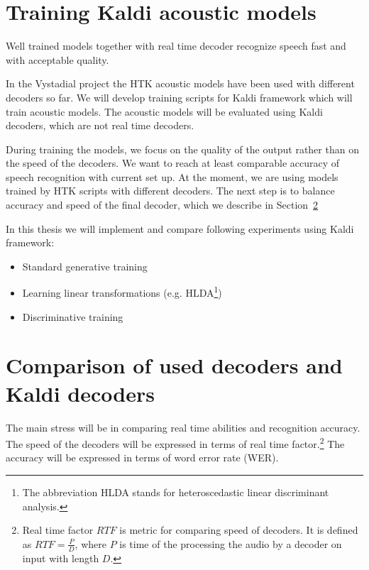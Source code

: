 
\section{Training Kaldi acoustic models} 
\label{sec:training_kaldi_acoustic_models}
Well trained models together with real time decoder recognize speech fast and with acceptable quality.

In the Vystadial project the HTK acoustic models have been used with different decoders so far. We will develop training scripts for Kaldi framework which will train acoustic models. The acoustic models will be evaluated using Kaldi decoders, which are not real time decoders. 

During training the models, we focus on the quality of the output rather than on the speed of the decoders. We want to reach at least comparable accuracy of speech recognition with current set up. At the moment, we are using models trained by HTK scripts with different decoders. The next step is to balance accuracy and speed of the final decoder, which we describe in Section~\ref{sec:compare_rt}

In this thesis we will implement and compare following experiments using Kaldi framework:
\begin{itemize}
    \item Standard generative training
    \item Learning linear transformations (e.g. HLDA\footnote{The abbreviation HLDA stands for heteroscedastic linear discriminant analysis.})
    \item Discriminative training 
\end{itemize}

 

\section{Comparison of used decoders and Kaldi decoders} 
\label{sec:compare_rt}
The main stress will be in comparing real time abilities and recognition accuracy. The speed of the decoders will be expressed in terms of real time factor.\footnote{Real time factor $RTF$ is metric for comparing speed of decoders. It is defined as $RTF = \frac{P}{D}$, where $P$ is time of the processing the audio by a decoder on input with length $D$.} The accuracy will be expressed in terms of word error rate (WER).

